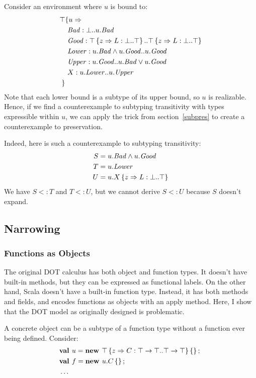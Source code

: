 \documentclass[preprint]{sigplanconf}
\begin{document}
Consider an environment where $u$ is bound to:
\begin{align*}
\top & \{u \Rightarrow \\
&\ \mathit{Bad} : \bot..u.\mathit{Bad}\\
&\ \mathit{Good} : \top \left\{z \Rightarrow L : \bot..\top \right\}..\top \left\{z \Rightarrow L : \bot..\top \right\}\\
&\ \mathit{Lower} : u.\mathit{Bad} \wedge u.\mathit{Good}..u.\mathit{Good}\\
&\ \mathit{Upper} : u.\mathit{Good}..u.\mathit{Bad} \vee u.\mathit{Good}\\
&\ X : u.\mathit{Lower}..u.\mathit{Upper}\\
 \}&
\end{align*}
Note that each lower bound is a subtype of its upper bound, so $u$ is
realizable. Hence, if we find a counterexample to subtyping
transitivity with types expressible within $u$, we can apply the trick
from section~\ref{subpres} to create a counterexample to preservation.

Indeed, here is such a counterexample to subtyping transitivity:
\begin{align*}
S &= u.\mathit{Bad} \wedge u.\mathit{Good}\\
T &= u.\mathit{Lower}\\
U &= u.X \left\{z \Rightarrow L : \bot..\top \right\}
\end{align*}
We have $S <: T$ and $T <: U$, but we cannot derive $S <: U$ because
$S$ doesn't expand.

\subsection{Narrowing}\label{narrowing}

\subsubsection{Functions as Objects}\label{fun}

The original DOT calculus has both object and function types. It
doesn't have built-in methods, but they can be expressed as functional
labels. On the other hand, Scala doesn't have a built-in function
type. Instead, it has both methods and fields, and encodes functions
as objects with an apply method. Here, I show that the DOT model as
originally designed is problematic.

A concrete object can be a subtype of a function type without a
function ever being defined. Consider:
\begin{align*}
&\mlnew u {\Top \refine z {\Ldecl C {\Top \tfun \Top} {\Top \tfun \Top}} \ldefs{}} {
\mlnew f {u.C \ldefs{}} {
\ldots
}}
\end{align*}
\end{document}
